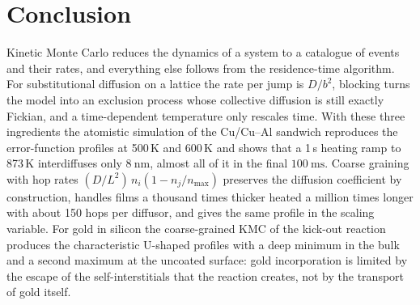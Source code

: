 \documentclass[11pt,a4paper]{article}
\numberwithin{equation}{section}
\theoremstyle{remark}
\begin{document}
\section{Conclusion}\label{sec:conclusion}

Kinetic Monte Carlo reduces the dynamics of a system to a catalogue of events and their rates, and
everything else follows from the residence-time algorithm. For substitutional diffusion on a lattice
the rate per jump is $D/b^2$, blocking turns the model into an exclusion process whose collective
diffusion is still exactly Fickian, and a time-dependent temperature only rescales time. With these
three ingredients the atomistic simulation of the Cu/Cu--Al sandwich reproduces the error-function
profiles at 500\,K and 600\,K and shows that a 1\,s heating ramp to 873\,K interdiffuses only
$\SI{8}{\nano\metre}$, almost all of it in the final $\SI{100}{\milli\second}$. Coarse graining with hop
rates $(D/L^2)\,n_i(1-n_j/n_{\max})$ preserves the diffusion coefficient by construction, handles films
a thousand times thicker heated a million times longer with about 150 hops per diffusor, and gives the
same profile in the scaling variable. For gold in silicon the coarse-grained KMC of the kick-out
reaction produces the characteristic U-shaped profiles with a deep minimum in the bulk and a second
maximum at the uncoated surface: gold incorporation is limited by the escape of the self-interstitials
that the reaction creates, not by the transport of gold itself.
\end{document}
